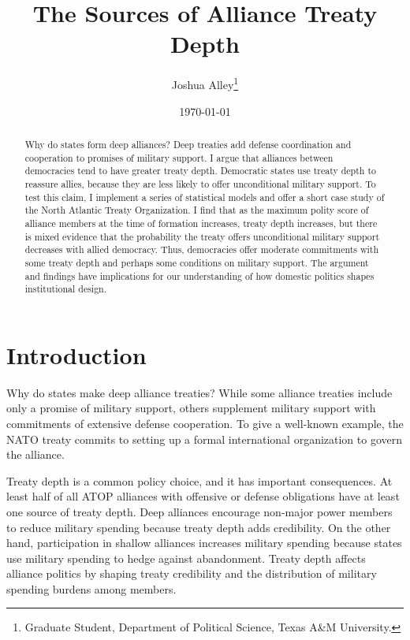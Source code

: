 \documentclass[12pt]{article}
\title{\textbf{The Sources of Alliance Treaty Depth}}
\author{Joshua Alley\footnote{Graduate Student,
Department of Political Science, Texas A\&M University.}}
\date{\today}
\begin{document}
\maketitle 

\doublespace 

\begin{abstract}
Why do states form deep alliances? 
Deep treaties add defense coordination and cooperation to promises of military support.
I argue that alliances between democracies tend to have greater treaty depth. 
Democratic states use treaty depth to reassure allies, because they are less likely to offer unconditional military support.
To test this claim, I implement a series of statistical models and offer a short case study of the North Atlantic Treaty Organization.
I find that as the maximum polity score of alliance members at the time of formation increases, treaty depth increases, but there is mixed evidence that the probability the treaty offers unconditional military support decreases with allied democracy. 
Thus, democracies offer moderate commitments with some treaty depth and perhaps some conditions on military support. 
The argument and findings have implications for our understanding of how domestic politics shapes institutional design. 
\end{abstract}


\newpage 


\section{Introduction}


Why do states make deep alliance treaties? 
While some alliance treaties include only a promise of military support, others supplement military support with commitments of extensive defense cooperation. 
To give a well-known example, the NATO treaty commits to setting up a formal international organization to govern the alliance. 


Treaty depth is a common policy choice, and it has important consequences. 
At least half of all ATOP alliances with offensive or defense obligations have at least one source of treaty depth.
Deep alliances encourage non-major power members to reduce military spending because treaty depth adds credibility.  
On the other hand, participation in shallow alliances increases military spending because states use military spending to hedge against abandonment.
Treaty depth affects alliance politics by shaping treaty credibility and the distribution of military spending burdens among members. 
\end{document}
